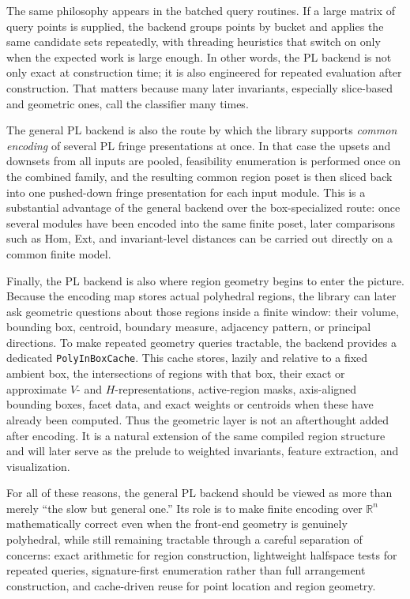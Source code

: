 \documentclass[11pt]{article}
\newcommand{\R}{\mathbb{R}}
\theoremstyle{definition}
\theoremstyle{remark}
\begin{document}
The same philosophy appears in the batched query routines.  If a large matrix of query points is supplied, the backend groups points by bucket and applies the same candidate sets repeatedly, with threading heuristics that switch on only when the expected work is large enough.  In other words, the PL backend is not only exact at construction time; it is also engineered for repeated evaluation after construction.  That matters because many later invariants, especially slice-based and geometric ones, call the classifier many times.

The general PL backend is also the route by which the library supports \emph{common encoding} of several PL fringe presentations at once.  In that case the upsets and downsets from all inputs are pooled, feasibility enumeration is performed once on the combined family, and the resulting common region poset is then sliced back into one pushed-down fringe presentation for each input module.  This is a substantial advantage of the general backend over the box-specialized route: once several modules have been encoded into the same finite poset, later comparisons such as Hom, Ext, and invariant-level distances can be carried out directly on a common finite model.

Finally, the PL backend is also where region geometry begins to enter the picture.  Because the encoding map stores actual polyhedral regions, the library can later ask geometric questions about those regions inside a finite window: their volume, bounding box, centroid, boundary measure, adjacency pattern, or principal directions.  To make repeated geometry queries tractable, the backend provides a dedicated \texttt{PolyInBoxCache}.  This cache stores, lazily and relative to a fixed ambient box, the intersections of regions with that box, their exact or approximate \(V\)- and \(H\)-representations, active-region masks, axis-aligned bounding boxes, facet data, and exact weights or centroids when these have already been computed.  Thus the geometric layer is not an afterthought added after encoding.  It is a natural extension of the same compiled region structure and will later serve as the prelude to weighted invariants, feature extraction, and visualization.

For all of these reasons, the general PL backend should be viewed as more than merely ``the slow but general one.''  Its role is to make finite encoding over \(\R^n\) mathematically correct even when the front-end geometry is genuinely polyhedral, while still remaining tractable through a careful separation of concerns: exact arithmetic for region construction, lightweight halfspace tests for repeated queries, signature-first enumeration rather than full arrangement construction, and cache-driven reuse for point location and region geometry.
  
\end{document}
